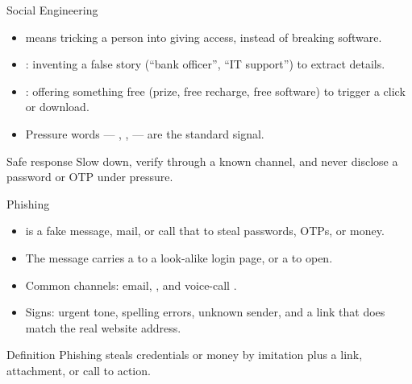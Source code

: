 \documentclass[aspectratio=169]{beamer}
\begin{document}
\begin{frame}{Social Engineering}
  \begin{itemize}
    \item {} means tricking a person into giving
      access, instead of breaking software.
    \item {}: inventing a false story (``bank officer'',
      ``IT support'') to extract details.
    \item {}: offering something free (prize, free recharge,
      free software) to trigger a click or download.
    \item Pressure words --- , ,  --- are the standard signal.
  \end{itemize}
  \begin{alertblock}{Safe response}
    Slow down, verify through a known channel, and never disclose a
    password or OTP under pressure.
  \end{alertblock}
\end{frame}

\begin{frame}{Phishing}
  \begin{itemize}
    \item {} is a fake message, mail, or call that
       to steal passwords, OTPs, or
      money.
    \item The message carries a  to a look-alike
      login page, or a  to open.
    \item Common channels: email, , and voice-call
      .
    \item Signs: urgent tone, spelling errors, unknown sender, and a
      link that does  match the real website address.
  \end{itemize}
  \begin{block}{Definition}
    Phishing steals credentials or money by imitation plus a link,
    attachment, or call to action.
  \end{block}
\end{frame}
\end{document}
